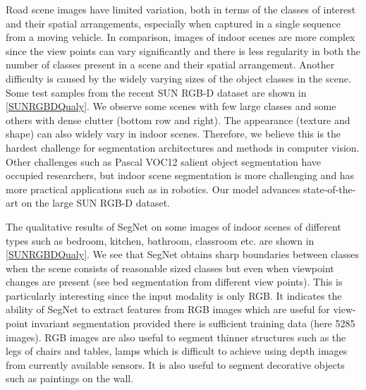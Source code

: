 Road scene images have limited variation, both in terms of the classes of interest and their spatial arrangements, especially when captured in a single sequence from a moving vehicle. In comparison, images of indoor scenes are more complex since the view points can vary significantly and there is less regularity in both the number of classes present in a scene and their spatial arrangement. Another difficulty is caused by the widely varying sizes of the object classes in the scene. Some test samples from the recent SUN RGB-D dataset \citep{song2015sun} are shown in \cref{SUNRGBDQualy}. We observe some scenes with few large classes and some others with dense clutter (bottom row and right). The appearance (texture and shape) can also widely vary in indoor scenes. Therefore, we believe this is the hardest challenge for segmentation architectures and methods in computer vision. Other challenges such as Pascal VOC12 \citep{pascal} salient object segmentation have occupied researchers, but indoor scene segmentation is more challenging and has more practical applications such as in robotics. Our model advances state-of-the-art on the large SUN RGB-D dataset.

The qualitative results of SegNet on some images of indoor scenes of different types such as bedroom, kitchen, bathroom, classroom etc. are shown in \cref{SUNRGBDQualy}. We see that SegNet obtains sharp boundaries between classes when the scene consists of reasonable sized classes but even when viewpoint changes are present (see bed segmentation from different view points). This is particularly interesting since the input modality is only RGB. It indicates the ability of SegNet to extract features from RGB images which are useful for view-point invariant segmentation provided there is sufficient training data (here 5285 images). RGB images are also useful to segment thinner structures such as the legs of chairs and tables, lamps which is difficult to achieve using depth images from currently available sensors. It is also useful to segment decorative objects such as paintings on the wall. 

